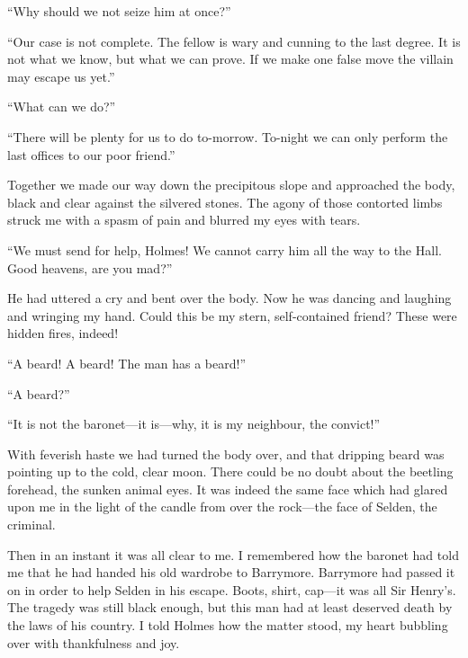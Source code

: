 \documentclass[paper=5.5in:8.5in,BCOR=7mm,twoside,DIV=calc,12pt,usegeometry,openany,chapterprefix,endperiod]{scrbook} %
\begin{document}
\enquote{Why should we not seize him at once?}

\enquote{Our case is not complete. The fellow is wary and cunning to the last degree. It is not what we know, but what we can prove. If we make one false move the villain may escape us yet.}

\enquote{What can we do?}

\enquote{There will be plenty for us to do to-morrow. To-night we can only perform the last offices to our poor friend.}

Together we made our way down the precipitous slope and approached the body, black and clear against the silvered stones. The agony of those contorted limbs struck me with a spasm of pain and blurred my eyes with tears.

\enquote{We must send for help, Holmes! We cannot carry him all the way to the Hall. Good heavens, are you mad?}

He had uttered a cry and bent over the body. Now he was dancing and laughing and wringing my hand. Could this be my stern, self-contained friend? These were hidden fires, indeed!

\enquote{A beard! A beard! The man has a beard!}

\enquote{A beard?}

\enquote{It is not the baronet\nobreakdash---it is\nobreakdash---why, it is my neighbour, the convict!}

With feverish haste we had turned the body over, and that dripping beard was pointing up to the cold, clear moon. There could be no doubt about the beetling forehead, the sunken animal eyes. It was indeed the same face which had glared upon me in the light of the candle from over the rock\nobreakdash---the face of Selden, the criminal.


Then in an instant it was all clear to me. I remembered how the baronet had told me that he had handed his old wardrobe to Barrymore. Barrymore had passed it on in order to help Selden in his escape. Boots, shirt, cap\nobreakdash---it was all Sir Henry's. The tragedy was still black enough, but this man had at least deserved death by the laws of his country. I told Holmes how the matter stood, my heart bubbling over with thankfulness and joy.
\end{document}
